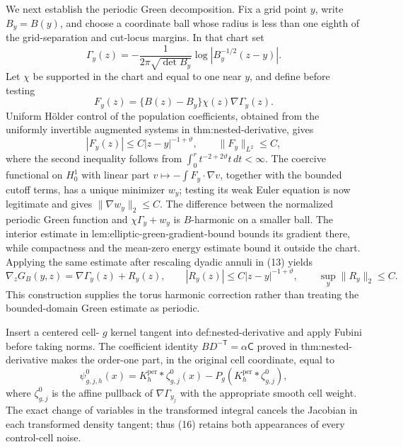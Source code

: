 We next establish the periodic Green decomposition.  Fix a grid point \(y\), write \(B_y=B(y)\), and choose a coordinate ball whose radius is less than one eighth of the grid-separation and cut-locus margins.  In that chart set
\[
 \Gamma_y(z)=-\frac1{2\pi\sqrt{\det B_y}}
       \log\left|B_y^{-1/2}(z-y)\right|.
\tag{12}
\]
Let \(\chi\) be supported in the chart and equal to one near \(y\), and define before testing
\[
 F_y(z)=\{B(z)-B_y\}\chi(z)\nabla\Gamma_y(z).
\tag{13}
\]
Uniform H\"older control of the population coefficients, obtained from the uniformly invertible augmented systems in thm:nested-derivative, gives
\[
 |F_y(z)|\leq C|z-y|^{-1+\vartheta},
 \qquad \|F_y\|_{L^2}\leq C,
\tag{14}
\]
where the second inequality follows from
\(\int_0^r t^{-2+2\vartheta}t\,dt<\infty\).  The coercive functional on
\(H_0^1\) with linear part \(v\mapsto-\int F_y\cdot\nabla v\), together with the bounded cutoff terms, has a unique minimizer \(w_y\); testing its weak Euler equation is now legitimate and gives
\(\|\nabla w_y\|_2\leq C\).  The difference between the normalized periodic Green function and
\(\chi\Gamma_y+w_y\) is \(B\)-harmonic on a smaller ball.  The interior estimate in lem:elliptic-green-gradient-bound bounds its gradient there, while compactness and the mean-zero energy estimate bound it outside the chart.  Applying the same estimate after rescaling dyadic annuli in (13) yields
\[
 \nabla_zG_B(y,z)=\nabla\Gamma_y(z)+R_y(z),
 \qquad |R_y(z)|\leq C|z-y|^{-1+\vartheta},
 \qquad \sup_y\|R_y\|_2\leq C.
\tag{15}
\]
This construction supplies the torus harmonic correction rather than treating the bounded-domain Green estimate as periodic.

Insert a centered cell-
\(g\) kernel tangent into def:nested-derivative and apply Fubini before taking norms.  The coefficient identity
\(BD^{-\mathsf T}=\alpha\mathsf C\) proved in thm:nested-derivative makes the order-one part, in the original cell coordinate, equal to
\[
 \psi^0_{g,j,h}(x)
 =K_h^{\mathrm{per}}*\zeta^0_{g,j}(x)
   -P_g(K_h^{\mathrm{per}}*\zeta^0_{g,j}),
\tag{16}
\]
where \(\zeta^0_{g,j}\) is the affine pullback of \(\nabla\Gamma_{y_j}\) with the appropriate smooth cell weight.  The exact change of variables in the transformed integral cancels the Jacobian in each transformed density tangent; thus (16) retains both appearances of every control-cell noise.

